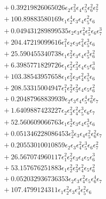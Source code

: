 \documentclass[10pt]{article}
\begin{document}
\begin{align*}
&{}  + 0.39219826065026 \epsilon_{2} \epsilon_{3}^{2} \epsilon_{4} \epsilon_{5}^{2} \epsilon_{6}^{2} \epsilon_{7}^{2} \\
&{}  + 100.89883580169 \epsilon_{1} \epsilon_{2}^{4} \epsilon_{3} \epsilon_{4} \epsilon_{5}^{2} \epsilon_{6} \\
&{}  + 0.049431289899535 \epsilon_{2} \epsilon_{3} \epsilon_{4}^{2} \epsilon_{5}^{2} \epsilon_{6} \epsilon_{7}^{3} \\
&{}  + 204.47219099616 \epsilon_{1}^{2} \epsilon_{2} \epsilon_{3} \epsilon_{4}^{2} \epsilon_{5}^{3} \epsilon_{6} \\
&{}  + 25.590455340738 \epsilon_{1} \epsilon_{2}^{2} \epsilon_{3} \epsilon_{4} \epsilon_{5}^{3} \epsilon_{6}^{2} \\
&{}  + 6.3985771829726 \epsilon_{1} \epsilon_{2}^{2} \epsilon_{3}^{2} \epsilon_{4} \epsilon_{5} \epsilon_{6}^{3} \\
&{}  + 103.38543957658 \epsilon_{1} \epsilon_{2}^{2} \epsilon_{3} \epsilon_{4}^{2} \epsilon_{5}^{3} \epsilon_{6} \\
&{}  + 208.53315004947 \epsilon_{1}^{2} \epsilon_{2}^{2} \epsilon_{3}^{2} \epsilon_{4} \epsilon_{5} \epsilon_{6}^{2} \\
&{}  + 0.20487968839939 \epsilon_{2} \epsilon_{3} \epsilon_{4} \epsilon_{5}^{4} \epsilon_{6}^{2} \epsilon_{7} \\
&{}  + 1.6409887423227 \epsilon_{2} \epsilon_{3}^{2} \epsilon_{4}^{2} \epsilon_{5}^{3} \epsilon_{6} \epsilon_{7} \\
&{}  + 52.560609066763 \epsilon_{1} \epsilon_{2}^{3} \epsilon_{3} \epsilon_{4} \epsilon_{5}^{3} \epsilon_{6} \\
&{}  + 0.051346228086453 \epsilon_{2}^{3} \epsilon_{3} \epsilon_{4} \epsilon_{5}^{2} \epsilon_{6}^{2} \epsilon_{7} \\
&{}  + 0.20553010010859 \epsilon_{2} \epsilon_{3} \epsilon_{4}^{2} \epsilon_{5}^{3} \epsilon_{6} \epsilon_{7}^{2} \\
&{}  + 26.567074960117 \epsilon_{1}^{2} \epsilon_{2}^{2} \epsilon_{3} \epsilon_{4} \epsilon_{5} \epsilon_{6}^{3} \\
&{}  + 53.157676251883 \epsilon_{1} \epsilon_{2}^{2} \epsilon_{3}^{2} \epsilon_{4}^{2} \epsilon_{5} \epsilon_{6}^{2} \\
&{}  + 0.052032936736353 \epsilon_{2} \epsilon_{3} \epsilon_{4}^{2} \epsilon_{5} \epsilon_{6}^{4} \epsilon_{7} \\
&{}  + 107.4799124311 \epsilon_{1} \epsilon_{2}^{2} \epsilon_{3} \epsilon_{4}^{3} \epsilon_{5}^{2} \epsilon_{6} \\

\end{align*}
\end{document}
